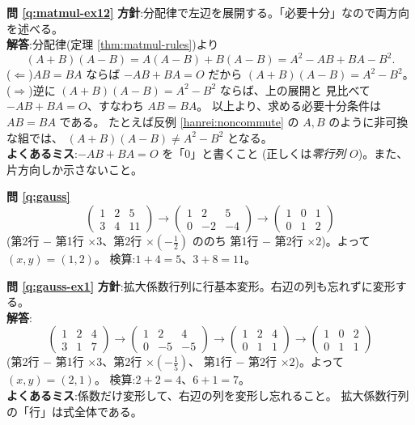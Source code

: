 \bigskip
\noindent\textbf{問 \ref{q:matmul-ex12}}\quad
\textbf{方針}:分配律で左辺を展開する。「必要十分」なので両方向を述べる。\\
\textbf{解答}:分配律(定理 \ref{thm:matmul-rules})より
\[
(A + B)(A - B) = A(A - B) + B(A - B) = A^2 - AB + BA - B^2.
\]
($\Leftarrow$)$AB = BA$ ならば $-AB + BA = O$ だから
$(A + B)(A - B) = A^2 - B^2$。
($\Rightarrow$)逆に $(A + B)(A - B) = A^2 - B^2$ ならば、上の展開と
見比べて $-AB + BA = O$、すなわち $AB = BA$。
以上より、求める必要十分条件は $AB = BA$ である。
たとえば反例 \ref{hanrei:noncommute} の $A, B$ のように非可換な組では、
$(A + B)(A - B) \ne A^2 - B^2$ となる。\\
\textbf{よくあるミス}:$-AB + BA = O$ を「$0$」と書くこと
(正しくは\emph{零行列} $O$)。また、片方向しか示さないこと。

\bigskip
\noindent\textbf{問 \ref{q:gauss}}\quad
\[
\left(\begin{array}{cc|c}
1 & 2 & 5 \\
3 & 4 & 11
\end{array}\right)
\longrightarrow
\left(\begin{array}{cc|c}
1 & 2 & 5 \\
0 & -2 & -4
\end{array}\right)
\longrightarrow
\left(\begin{array}{cc|c}
1 & 0 & 1 \\
0 & 1 & 2
\end{array}\right)
\]
(第2行 $-$ 第1行 $\times 3$、第2行 $\times (-\frac{1}{2})$ ののち
第1行 $-$ 第2行 $\times 2$)。よって $(x, y) = (1, 2)$。
検算:$1 + 4 = 5$、$3 + 8 = 11$。

\bigskip
\noindent\textbf{問 \ref{q:gauss-ex1}}\quad
\textbf{方針}:拡大係数行列に行基本変形。右辺の列も忘れずに変形する。\\
\textbf{解答}:
\[
\left(\begin{array}{cc|c}
1 & 2 & 4 \\
3 & 1 & 7
\end{array}\right)
\longrightarrow
\left(\begin{array}{cc|c}
1 & 2 & 4 \\
0 & -5 & -5
\end{array}\right)
\longrightarrow
\left(\begin{array}{cc|c}
1 & 2 & 4 \\
0 & 1 & 1
\end{array}\right)
\longrightarrow
\left(\begin{array}{cc|c}
1 & 0 & 2 \\
0 & 1 & 1
\end{array}\right)
\]
(第2行 $-$ 第1行 $\times 3$、第2行 $\times(-\frac{1}{5})$、
第1行 $-$ 第2行 $\times 2$)。よって $(x, y) = (2, 1)$。
検算:$2 + 2 = 4$、$6 + 1 = 7$。\\
\textbf{よくあるミス}:係数だけ変形して、右辺の列を変形し忘れること。
拡大係数行列の「行」は式全体である。

